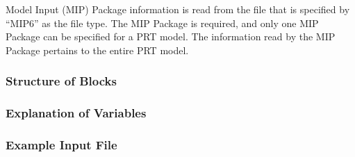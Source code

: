 Model Input (MIP) Package information is read from the file that is specified by ``MIP6'' as the file type.  The MIP Package is required, and only one MIP Package can be specified for a PRT model.  The information read by the MIP Package pertains to the entire PRT model.

\vspace{5mm}
\subsubsection{Structure of Blocks}



\vspace{5mm}
\subsubsection{Explanation of Variables}
\begin{description}

\end{description}

\vspace{5mm}
\subsubsection{Example Input File}


